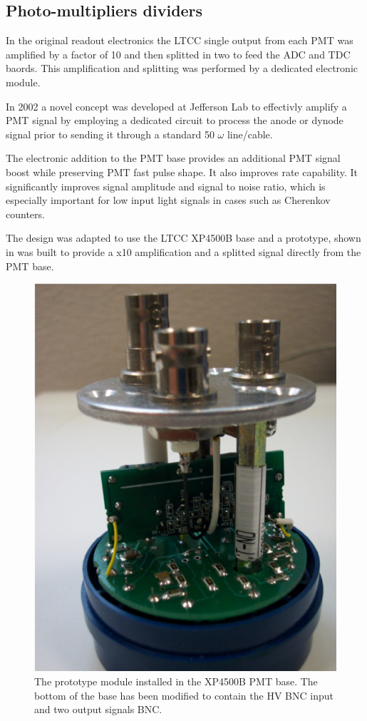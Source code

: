 \subsection{Photo-multipliers dividers}

In the original readout electronics the LTCC single output from each PMT was amplified by a factor of 10
and then splitted in two to feed the ADC and TDC baords. This amplification and splitting was performed
by a dedicated electronic module. 

In 2002 a novel concept \cite{Popov:2003mj} was developed at Jefferson Lab to effectivly amplify a PMT signal by employing a dedicated circuit
to process the anode or dynode signal prior to sending it through a standard 50 $\omega$ line/cable.

The electronic addition to the PMT base provides an additional PMT signal boost while preserving
PMT fast pulse shape. It also improves rate capability. It significantly improves signal amplitude and
signal to noise ratio, which is especially important for low input light signals in cases such as Cherenkov counters.

The design was adapted to use the LTCC XP4500B base and a prototype, shown in  was built to provide a x10
amplification and a splitted signal directly from the PMT base.


\begin{figure}
	\centering
	\includegraphics[width=0.95\columnwidth,keepaspectratio]{img/pmtWithDivider.png}
	\caption{The prototype module installed in the XP4500B PMT base. The bottom of the base has been modified to contain the HV
				BNC input and two output signals BNC. }
	\label{fig:pmtWithDivider}
\end{figure}

